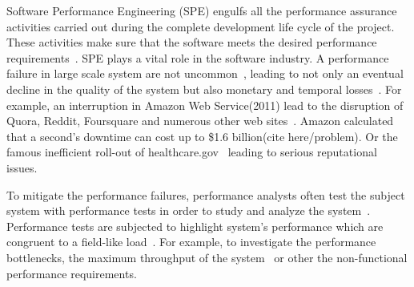 Software Performance Engineering (SPE) engulfs all the performance assurance activities carried out during the complete development life cycle of the project. These activities make sure that the software meets the desired performance requirements~\cite{futureofspe}. SPE plays a vital role in the software industry. A performance failure in large scale system are not uncommon~\cite{tailatscale, foo2010mining}, leading to not only an eventual decline in the quality of the system but also monetary and temporal losses~\cite{costofdowntime}. For example, an interruption in Amazon Web Service(2011) lead to the disruption of Quora, Reddit, Foursquare and numerous other web sites~\cite{amazondown}. Amazon calculated that a second's downtime can cost up to \$1.6 billion(cite here/problem). Or the famous inefficient roll-out of healthcare.gov~\cite{healthcare} leading to serious reputational issues.


To mitigate the performance failures, performance analysts often test the subject system with performance tests in order to study and analyze the system~\cite{futureofspe}. Performance tests are subjected to highlight system's performance which are congruent to a field-like load~\cite{Shang:2015:ADP:2668930.2688052}. For example, to investigate the performance bottlenecks, the maximum throughput of the system~\cite{syer2014maintenance} or other the non-functional performance requirements.


